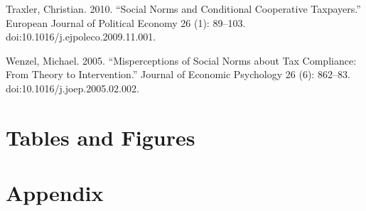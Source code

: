 \documentclass[12pt,titlepage]{article}
\begin{document}
Traxler, Christian. 2010. “Social Norms and Conditional Cooperative Taxpayers.” European Journal of Political Economy 26 (1): 89–103. doi:10.1016/j.ejpoleco.2009.11.001.

Wenzel, Michael. 2005. “Misperceptions of Social Norms about Tax Compliance: From Theory to Intervention.” Journal of Economic Psychology 26 (6): 862–83. doi:10.1016/j.joep.2005.02.002.

\section{Tables and Figures}








\section{Appendix}

\end{document}

